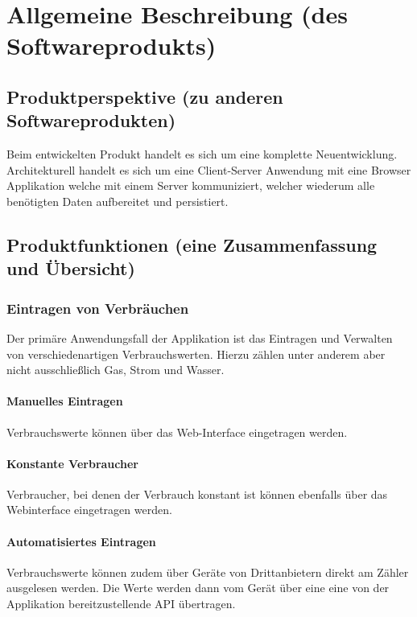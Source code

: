 \section{Allgemeine Beschreibung (des Softwareprodukts)}


\subsection{Produktperspektive (zu anderen Softwareprodukten)}


Beim entwickelten Produkt handelt es sich um eine komplette Neuentwicklung. Architekturell handelt es sich um eine Client-Server Anwendung mit eine Browser Applikation welche mit einem Server kommuniziert, welcher wiederum alle benötigten Daten aufbereitet und persistiert.

\subsection{Produktfunktionen (eine Zusammenfassung und Übersicht)}

\subsubsection{Eintragen von Verbräuchen}

Der primäre Anwendungsfall der Applikation ist das Eintragen und Verwalten von verschiedenartigen Verbrauchswerten. Hierzu zählen unter anderem aber nicht ausschließlich Gas, Strom und Wasser. 

\paragraph{Manuelles Eintragen}

    Verbrauchswerte können über das Web-Interface eingetragen werden.

\paragraph{Konstante Verbraucher}
    Verbraucher, bei denen der Verbrauch konstant ist können ebenfalls über das Webinterface eingetragen werden.

\paragraph{Automatisiertes Eintragen}
\label{autom_eintragen}

    Verbrauchswerte können zudem über Geräte von Drittanbietern direkt am Zähler ausgelesen werden. Die Werte werden dann vom Gerät über eine eine von der Applikation bereitzustellende API übertragen.

